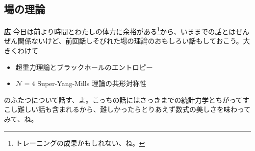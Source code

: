 \documentclass[paper=b5j,fontsize=12Q,jafontsize=12Q,baselineskip=21Q]{jlreq}
\DeclareRobustCommand{\hiron}{\textbf{広 }}
\begin{document}
\begin{refsection}
\section{場の理論}
\hiron 今日は前より時間とわたしの体力に余裕がある\footnote{トレーニングの成果かもしれない、ね。}から、いままでの話とはぜんぜん関係ないけど、前回話しそびれた場の理論のおもしろい話もしておこう。大きくわけて
\begin{itemize}
  \item 超重力理論とブラックホールのエントロピー
  \item $\mathcal N =4$ Super-Yang-Mills 理論の共形対称性
\end{itemize}
のふたつについて話す、よ。こっちの話にはさっきまでの統計力学とちがってすこし難しい話も含まれるから、難しかったらとりあえず数式の美しさを味わってみて、ね。


\end{refsection}
\end{document}
